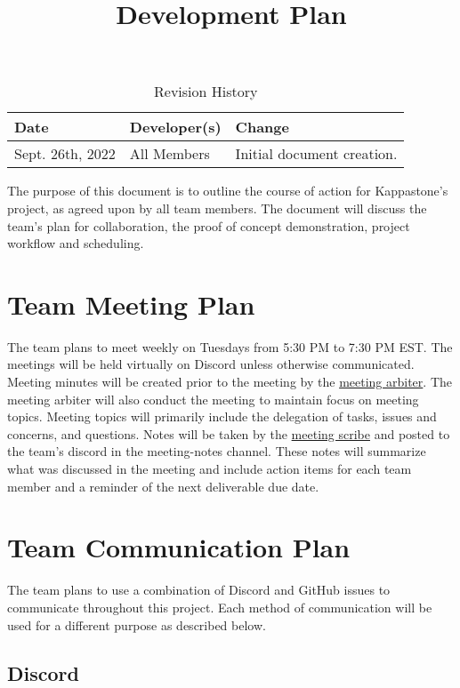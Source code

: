 \documentclass{article}
\title{Development Plan\\\progname}
\author{\authname}
\date{}
\begin{document}
\begin{table}[hp]
\caption{Revision History} \label{TblRevisionHistory}
\begin{tabularx}{\textwidth}{llX}
\toprule
\textbf{Date} & \textbf{Developer(s)} & \textbf{Change}\\
\midrule
Sept. 26th, 2022  & All Members & Initial document creation. \\
\bottomrule
\end{tabularx}
\end{table}

\newpage

\maketitle

The purpose of this document is to outline the course of action for Kappastone's project, as agreed upon by all team members. The document will discuss the team's plan for collaboration, the proof of concept demonstration, project workflow and scheduling.   

\section{Team Meeting Plan}

The team plans to meet weekly on Tuesdays from 5:30 PM to 7:30 PM EST. The meetings will be held virtually on Discord unless otherwise communicated. Meeting minutes will be created prior to the meeting by the \hyperref[role:meetingarb]{meeting arbiter}. The meeting arbiter will also conduct the meeting to maintain focus on meeting topics. Meeting topics will primarily include the delegation of tasks, issues and concerns, and questions. Notes will be taken by the \hyperref[role:meetingscrib]{meeting scribe} and posted to the team's discord in the meeting-notes channel. These notes will summarize what was discussed in the meeting and include action items for each team member and a reminder of the next deliverable due date.

\section{Team Communication Plan}

The team plans to use a combination of Discord and GitHub issues to communicate throughout this project. Each method of communication will be used for a different purpose as described below.

\subsection{Discord}
\end{document}
